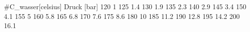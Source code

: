 #C_wasser[celsius] Druck [bar]
120     1
125     1.4
130     1.9
135     2.3
140     2.9
145     3.4
150     4.1
155     5
160     5.8
165     6.8
170     7.6
175     8.6
180     10
185     11.2
190     12.8
195     14.2
200     16.1
